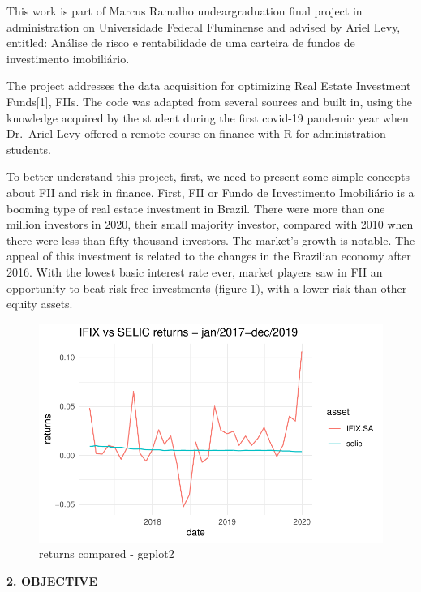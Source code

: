 \documentclass[
]{article}
\begin{document}
This work is part of Marcus Ramalho undeargraduation final project in
administration on Universidade Federal Fluminense and advised by Ariel
Levy, entitled: Análise de risco e rentabilidade de uma carteira de
fundos de investimento imobiliário.

The project addresses the data acquisition for optimizing Real Estate
Investment Funds{[}1{]}, FIIs. The code was adapted from several sources
and built in, using the knowledge acquired by the student during the
first covid-19 pandemic year when Dr.~Ariel Levy offered a remote course
on finance with R for administration students.

To better understand this project, first, we need to present some simple
concepts about FII and risk in finance. First, FII or Fundo de
Investimento Imobiliário is a booming type of real estate investment in
Brazil. There were more than one million investors in 2020, their small
majority investor, compared with 2010 when there were less than fifty
thousand investors. The market's growth is notable. The appeal of this
investment is related to the changes in the Brazilian economy after
2016. With the lowest basic interest rate ever, market players saw in
FII an opportunity to beat risk-free investments (figure 1), with a
lower risk than other equity assets.

\begin{figure}

{\centering \includegraphics{FII_portfolio_opt_R_files/figure-pdf/Graph_1-1.pdf}

}

\caption{returns compared - ggplot2}

\end{figure}

\begin{center}
\textbf{2. OBJECTIVE}
\end{center}
\end{document}
